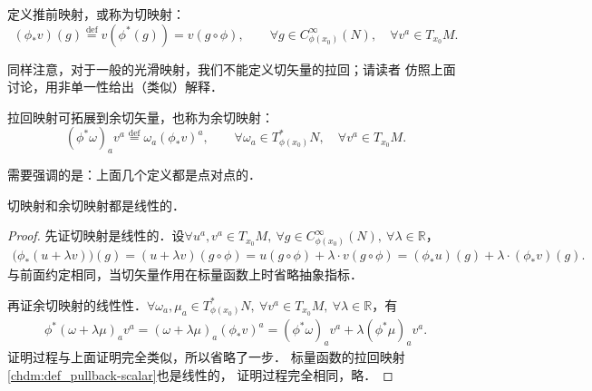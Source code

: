 

\begin{definition}\label{chdm:def_pushforward-vector}
    定义{\heiti 推前映射}，或称为{\heiti 切映射}：
    \begin{equation}
        (\phi_{*}v)(g) \overset{\mathrm {def}}{=} v(\phi^{*}(g)) = v (g \circ \phi), 
        \qquad \forall g\in C^\infty_{\phi(x_0)}(N),\quad \forall v^a \in T_{x_0}M .
    \end{equation}
\end{definition}

同样注意，对于一般的光滑映射，我们不能定义切矢量的拉回；请读者
仿照上面讨论，用非单一性给出（类似）解释．

\begin{definition}\label{chdm:def_pullback-1form}
    {\heiti 拉回映射}可拓展到余切矢量，也称为{\heiti 余切映射}：
    \begin{equation}
        (\phi^{*}\omega)_a v^a \overset{\mathrm {def}}{=} \omega_a (\phi_{*}v)^a ,
        \qquad \forall \omega_a \in T^{*}_{\phi(x_0)}N,\quad \forall v^a \in T_{x_0}M .
    \end{equation}
\end{definition}
需要强调的是：上面几个定义都是点对点的．


\begin{proposition}
    切映射和余切映射都是线性的．
\end{proposition}
\begin{proof}
    先证切映射是线性的．设$\forall u^a,v^a \in T_{x_0}M,\  \forall g\in C^\infty_{\phi(x_0)}(N),\ 
    \forall \lambda \in \mathbb{R}$，
    \begin{align*}
        \bigl(\phi_{*}(u+ \lambda v) \bigr)(g)= (u+ \lambda v)(g\circ \phi)
        =u(g\circ \phi) +\lambda \cdot v (g\circ \phi)
        =(\phi_{*} u) (g) + \lambda \cdot (\phi_{*}v)(g) .
    \end{align*}  %
    与前面约定相同，当切矢量作用在标量函数上时省略抽象指标．
    
    再证余切映射的线性性．$\forall \omega_a ,\mu_a \in T^{*}_{\phi(x_0)}N,\ 
    \forall v^a\in T_{x_0}M, \ \forall \lambda \in \mathbb{R}$，有
    \begin{align*}
         \phi^{*} (\omega+\lambda \mu )_a v^a  = 
        (\omega+\lambda \mu )_a (\phi_{*}v)^a 
        =(\phi^{*}\omega)_a v^a + \lambda(\phi^{*}\mu)_a v^a .
    \end{align*}
    证明过程与上面证明完全类似，所以省略了一步．
    标量函数的拉回映射\ref{chdm:def_pullback-scalar}也是线性的，
    证明过程完全相同，略．
\end{proof}

